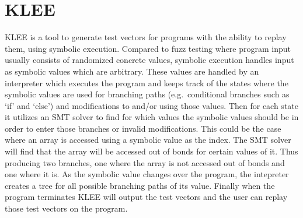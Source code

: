 \section{KLEE}
KLEE\cite{kleepaper} is a tool to generate test vectors for programs with the
ability to replay them, using symbolic execution. Compared to fuzz testing
where program input usually consists of randomized concrete values, symbolic
execution handles input as symbolic values which are arbitrary. These values
are handled by an interpreter which executes the program and keeps track of the
states where the symbolic values are used for branching paths (e.g.\
conditional branches such as `if' and `else') and modifications to and/or using
those values. Then for each state it utilizes an SMT solver to find for which
values the symbolic values should be in order to enter those branches or invalid
modifications. This could be the case where an array is accessed using a
symbolic value as the index. The SMT solver will find that the array will be
accessed out of bonds for certain values of it. Thus producing two branches,
one where the array is not accessed out of bonds and one where it is. As the
symbolic value changes over the program, the intepreter creates a tree for all
possible branching paths of its value. Finally when the program terminates KLEE
will output the test vectors and the user can replay those test vectors on the
program.

